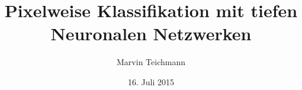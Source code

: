 \documentclass[hyperref={pdfpagelabels=false},usepdftitle=false]{beamer}
\begin{document}

\title{Pixelweise Klassifikation mit tiefen Neuronalen Netzwerken}
\author{Marvin Teichmann}
\date{16. Juli 2015}  %
\subject{Machine Learning}

\frame{\titlepage}








\end{document}
